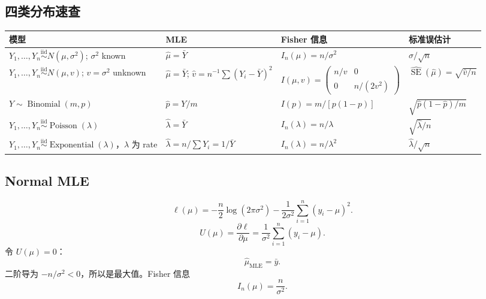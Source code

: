 \documentclass[11pt,a4paper]{article}
\newcommand{\SE}{\operatorname{SE}}
\newcommand{\iid}{\overset{\mathrm{iid}}{\sim}}
\begin{document}
\subsection{四类分布速查}

\begin{center}
\footnotesize
\renewcommand{\arraystretch}{1.35}
\begin{tabularx}{\textwidth}{@{}>{\raggedright\arraybackslash}p{}
>{\raggedright\arraybackslash}p{}
>{\raggedright\arraybackslash}p{}
>{\raggedright\arraybackslash}p{}@{}}
\toprule
模型 & MLE & Fisher 信息 & 标准误估计\\
\midrule
$Y_1,\ldots,Y_n\iid N(\mu,\sigma^2)$; $\sigma^2$ known
& $\hat\mu=\bar Y$
& $I_n(\mu)=n/\sigma^2$
& $\sigma/\sqrt n$\\
\addlinespace
$Y_1,\ldots,Y_n\iid N(\mu,v)$; $v=\sigma^2$ unknown
& $\hat\mu=\bar Y$; $\hat v=n^{-1}\sum(Y_i-\bar Y)^2$
& $I(\mu,v)=
\begin{pmatrix}
n/v & 0\\
0 & n/(2v^2)
\end{pmatrix}$
& $\widehat{\SE}(\hat\mu)=\sqrt{\hat v/n}$\\
\addlinespace
$Y\sim\operatorname{Binomial}(m,p)$
& $\hat p=Y/m$
& $I(p)=m/[p(1-p)]$
& $\sqrt{\hat p(1-\hat p)/m}$\\
\addlinespace
$Y_1,\ldots,Y_n\iid\operatorname{Poisson}(\lambda)$
& $\hat\lambda=\bar Y$
& $I_n(\lambda)=n/\lambda$
& $\sqrt{\hat\lambda/n}$\\
\addlinespace
$Y_1,\ldots,Y_n\iid\operatorname{Exponential}(\lambda)$，$\lambda$ 为 rate
& $\hat\lambda=n/\sum Y_i=1/\bar Y$
& $I_n(\lambda)=n/\lambda^2$
& $\hat\lambda/\sqrt n$\\
\bottomrule
\end{tabularx}
\end{center}

\subsection{Normal MLE}

\begin{proofbox}
\[
  \ell(\mu)
  =
  -\frac n2\log(2\pi\sigma^2)
  -
  \frac1{2\sigma^2}\sum_{i=1}^n(y_i-\mu)^2.
\]
\[
  U(\mu)=\frac{\partial\ell}{\partial\mu}
  =
  \frac1{\sigma^2}\sum_{i=1}^n(y_i-\mu).
\]
令 $U(\mu)=0$：
\[
  \boxed{\hat\mu_{\mathrm{MLE}}=\bar y}.
\]
二阶导为 $-n/\sigma^2<0$，所以是最大值。Fisher 信息
\[
  I_n(\mu)=\frac n{\sigma^2}.
\]
\end{proofbox}
\end{document}
